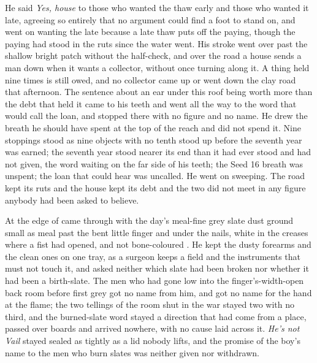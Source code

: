 He said \emph{Yes, house} to those who wanted the thaw early and those who wanted it late, agreeing so entirely that no argument could find a foot to stand on, and went on wanting the late because a late thaw puts off the paying, though the paying had stood in the ruts since the water went. His stroke went over  past the shallow bright patch without the half-check, and over the road a house sends a man down when it wants a collector, without once turning along it. A thing held nine times is still owed, and no collector came up or went down the clay road that afternoon. The sentence about an ear under this roof being worth more than the debt that held it came to his teeth and went all the way to the word that would call the loan, and stopped there with no figure and no name. He drew the breath he should have spent at the top of the reach and did not spend it. Nine stoppings stood as nine objects with no tenth stood up before the seventh year was earned; the seventh year stood nearer its end than it had ever stood and had not given, the word waiting on the far side of his teeth; the Seed 16 breath was unspent; the loan that could hear was uncalled. He went on sweeping. The road kept its ruts and the house kept its debt and the two did not meet in any figure anybody had been asked to believe.

At the edge of   came through with the day's meal-fine grey slate dust ground small as meal past the bent little finger and under the nails, white in the creases where a fist had opened, and not bone-coloured . He kept the dusty forearms and the clean ones on one tray, as a surgeon keeps a field and the instruments that must not touch it, and asked neither which slate had been broken nor whether it had been a birth-slate. The men who had gone low into the finger's-width-open back room before first grey got no name from him, and  got no name for the hand at the flame; the two tellings of the room shut in the war stayed two with no third, and the burned-slate word stayed a direction that had come from a place, passed over boards and arrived nowhere, with no cause laid across it. \emph{He's not Vail} stayed sealed as tightly as a lid nobody lifts, and the promise of the boy's name to the men who burn slates was neither given nor withdrawn.

